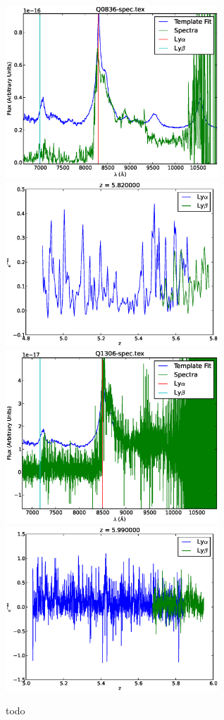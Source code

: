 \documentclass[11pt]{article}
\begin{document}
\begin{figure}[h]
  \centering
  \includegraphics[width=8cm]{Q0836-spec.eps}
  \includegraphics[width=8cm]{Q0836-spec_Transmission.eps}
  \includegraphics[width=8cm]{Q1306-spec.eps}
  \includegraphics[width=8cm]{Q1306-spec_Transmission.eps}
  \caption{todo}
  \label{fig:todo}
\end{figure}
\end{document}
